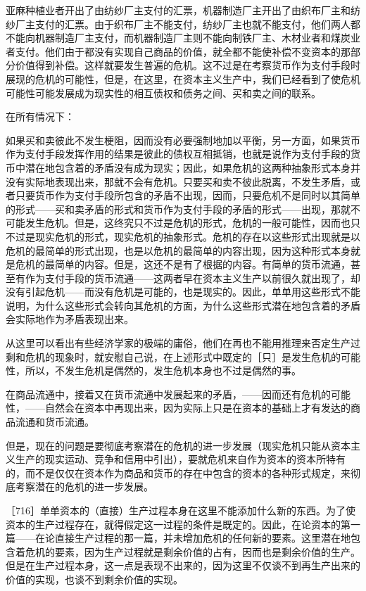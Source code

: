 亚麻种植业者开出了由纺纱厂主支付的汇票，机器制造厂主开出了由织布厂主和纺纱厂主支付的汇票。由于织布厂主不能支付，纺纱厂主也就不能支付，他们两人都不能向机器制造厂主支付，而机器制造厂主则不能向制铁厂主、木材业者和煤炭业者支付。他们由于都没有实现自己商品的价值，就全都不能使补偿不变资本的那部分价值得到补偿。这样就要发生普遍的危机。这不过是在考察货币作为支付手段时展现的危机的可能性，但是，在这里，在资本主义生产中，我们已经看到了使危机可能性可能发展成为现实性的相互债权和债务之间、买和卖之间的联系。

在所有情况下：

如果买和卖彼此不发生梗阻，因而没有必要强制地加以平衡，另一方面，如果货币作为支付手段发挥作用的结果是彼此的债权互相抵销，也就是说作为支付手段的货币中潜在地包含着的矛盾没有成为现实；因此，如果危机的这两种抽象形式本身并没有实际地表现出来，那就不会有危机。只要买和卖不彼此脱离，不发生矛盾，或者只要货币作为支付手段所包含的矛盾不出现，因而，只要危机不是同时以其简单的形式——买和卖矛盾的形式和货币作为支付手段的矛盾的形式——出现，那就不可能发生危机。但是，这终究只不过是危机的形式，危机的一般可能性，因而也只不过是现实危机的形式，现实危机的抽象形式。危机的存在以这些形式出现就是以危机的最简单的形式出现，也是以危机的最简单的内容出现，因为这种形式本身就是危机的最简单的内容。但是，这还不是有了根据的内容。有简单的货币流通，甚至有作为支付手段的货币流通——这两者早在资本主义生产以前很久就出现了，却没有引起危机——而没有危机是可能的，也是现实的。因此，单单用这些形式不能说明，为什么这些形式会转向其危机的方面，为什么这些形式潜在地包含着的矛盾会实际地作为矛盾表现出来。

从这里可以看出有些经济学家的极端的庸俗，他们在再也不能用推理来否定生产过剩和危机的现象时，就安慰自己说，在上述形式中既定的［只］是发生危机的可能性，所以，不发生危机是偶然的，发生危机本身也不过是偶然的事。

在商品流通中，接着又在货币流通中发展起来的矛盾，——因而还有危机的可能性，——自然会在资本中再现出来，因为实际上只是在资本的基础上才有发达的商品流通和货币流通。

但是，现在的问题是要彻底考察潜在的危机的进一步发展（现实危机只能从资本主义生产的现实运动、竞争和信用中引出），要就危机来自作为资本的资本所特有的，而不是仅仅在资本作为商品和货币的存在中包含的资本的各种形式规定，来彻底考察潜在的危机的进一步发展。

［716］单单资本的（直接）生产过程本身在这里不能添加什么新的东西。为了使资本的生产过程存在，就得假定这一过程的条件是既定的。因此，在论资本的第一篇——在论直接生产过程的那一篇，并未增加危机的任何新的要素。这里潜在地包含着危机的要素，因为生产过程就是剩余价值的占有，因而也是剩余价值的生产。但是在生产过程本身，这一点是表现不出来的，因为这里不仅谈不到再生产出来的价值的实现，也谈不到剩余价值的实现。

